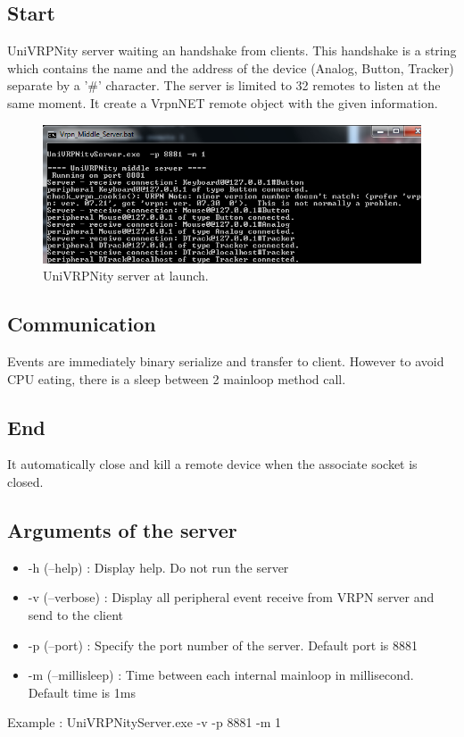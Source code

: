 \documentclass[11pt]{article} %
\begin{document}
	\subsection{Start}
	UniVRPNity server waiting an handshake from clients. This handshake is a string which contains the name and the address of the device (Analog, Button, Tracker) separate by a '\#' character. The server is limited to 32 remotes to listen at the same moment. It create a VrpnNET remote object with the given information.

	\begin{figure}[H]
		\begin{center}
			\includegraphics[scale=0.7]{UniVRPNityServer.png}
			\caption{UniVRPNity server at launch.}
		\end{center}
	\end{figure}


	\subsection{Communication}
	 Events are immediately binary serialize and transfer to client. However to avoid CPU eating, there is a sleep between 2 mainloop method call.

	\subsection{End}
	 It automatically close and kill a remote device when the associate socket is closed.
	
 	\subsection{Arguments of the server}
		\begin{itemize}
		      \item -h (--help) : Display help. Do not run the server
			\item -v (--verbose) : Display all peripheral event receive from VRPN server and send to the client
			\item -p (--port) : Specify the port number of the server. Default port is 8881
			\item -m (--millisleep) : Time between each internal mainloop in millisecond. Default time is 1ms
		\end{itemize}
		Example : UniVRPNityServer.exe -v -p 8881 -m 1
\end{document}

